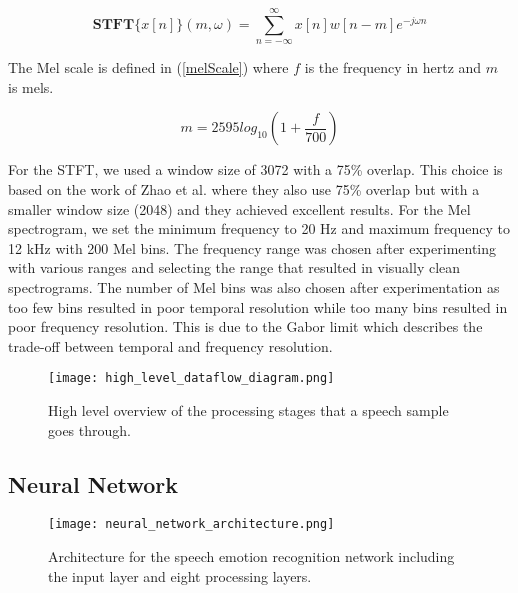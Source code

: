 \begin{equation}
	\label{stft}
	\mathbf{STFT}\{x[n]\}(m,\omega) = \sum_{n=-\infty}^{\infty}x[n]w[n-m]e^{-j \omega n}
\end{equation}

The Mel scale is defined in (\ref{melScale}) where $f$ is the frequency in hertz and $m$ is mels.\cite{Oshaughnessy1990}

\begin{equation}
	\label{melScale}
	m = 2595 log_{10}(1 + \frac{f}{700})
\end{equation}

For the STFT, we used a window size of 3072 with a 75\% overlap. This choice is based on the work of Zhao et al. \cite{Zhao2019} where they also use 75\% overlap but with a smaller window size (2048) and they achieved excellent results. For the Mel spectrogram, we set the minimum frequency to 20 Hz and maximum frequency to 12 kHz with 200 Mel bins. The frequency range was chosen after experimenting with various ranges and selecting the range that resulted in visually clean spectrograms. The number of Mel bins was also chosen after experimentation as too few bins resulted in poor temporal resolution while too many bins resulted in poor frequency resolution. This is due to the Gabor limit which describes the trade-off between temporal and frequency resolution.

\begin{figure}
	\centering
	\hspace{6mm}
	\texttt{[image: high\_level\_dataflow\_diagram.png]}
	\caption{High level overview of the processing stages that a speech sample goes through.}
	\label{highLevelDataFlowDiagram}
\end{figure}

\subsection{Neural Network}

\begin{figure*}
	\centering
	\hspace{6mm}
	\texttt{[image: neural\_network\_architecture.png]}
	\caption{Architecture for the speech emotion recognition network including the input layer and eight processing layers.}
	\label{neuralNetworkArchitecture}
\end{figure*}

